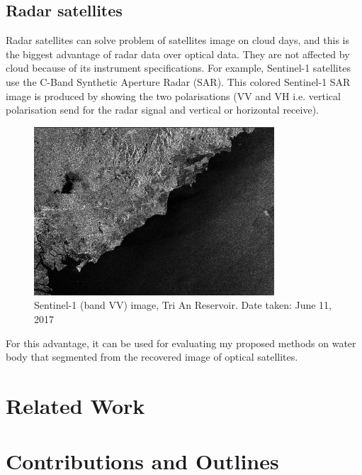 \subsection{Radar satellites}

Radar satellites can solve problem of satellites image on cloud days, and this is the biggest advantage of radar data over optical data. They are not affected by cloud because of its instrument specifications. For example, Sentinel-1 satellites use the C-Band Synthetic Aperture Radar (SAR). This colored Sentinel-1 SAR image is produced by showing the two polarisations (VV and VH i.e. vertical polarisation send for the radar signal and vertical or horizontal receive). 

\begin{figure}[h!]
	\centering
	\includegraphics[width=0.8\textwidth]{figures/sarImgVVS1.png}
	\caption{Sentinel-1 (band VV) image, Tri An Reservoir. Date taken: June 11, 2017}
\end{figure}	

For this advantage, it can be used for evaluating my proposed methods on water body that segmented from the recovered image of optical satellites.

\section{Related Work} %

\section{Contributions and Outlines} %


